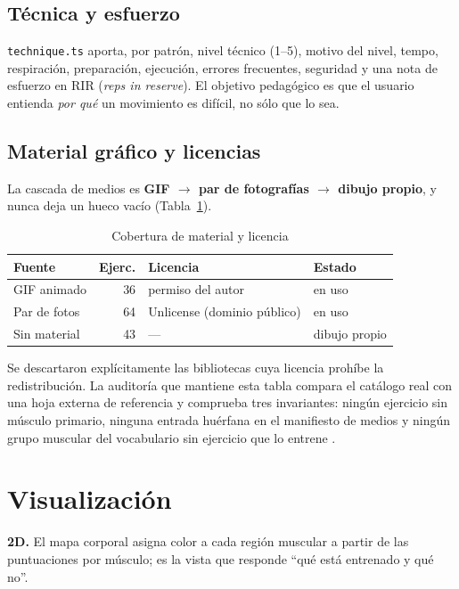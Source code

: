\documentclass[conference]{IEEEtran}
\newcommand{\code}[1]{\texttt{\small #1}}
\begin{document}
\subsection{T\'ecnica y esfuerzo}
\code{technique.ts} aporta, por patr\'on, nivel t\'ecnico (1--5), motivo del
nivel, tempo, respiraci\'on, preparaci\'on, ejecuci\'on, errores frecuentes,
seguridad y una nota de esfuerzo en RIR (\emph{reps in reserve}). El objetivo
pedag\'ogico es que el usuario entienda \emph{por qu\'e} un movimiento es
dif\'icil, no s\'olo que lo sea.

\subsection{Material gr\'afico y licencias}
La cascada de medios es \textbf{GIF $\rightarrow$ par de fotograf\'ias
$\rightarrow$ dibujo propio}, y nunca deja un hueco vac\'io
(Tabla~\ref{tab:media}).

\begin{table}[t]
\caption{Cobertura de material y licencia}
\label{tab:media}
\centering
\footnotesize
\begin{tabular}{@{}p{20mm}rp{28mm}p{13mm}@{}}
\toprule
Fuente & Ejerc. & Licencia & Estado \\
\midrule
GIF animado & 36 & permiso del autor & en uso \\
Par de fotos & 64 & Unlicense (dominio p\'ublico) & en uso \\
Sin material & 43 & --- & dibujo propio \\
\bottomrule
\end{tabular}
\end{table}

Se descartaron expl\'icitamente las bibliotecas cuya licencia proh\'ibe la
redistribuci\'on. La auditor\'ia que mantiene esta tabla compara el cat\'alogo
real con una hoja externa de referencia y comprueba tres invariantes: ning\'un
ejercicio sin m\'usculo primario, ninguna entrada hu\'erfana en el manifiesto de
medios y ning\'un grupo muscular del vocabulario sin ejercicio que lo
entrene \cite{audit}.

\section{Visualizaci\'on}

\textbf{2D.} El mapa corporal asigna color a cada regi\'on muscular a partir de
las puntuaciones por m\'usculo; es la vista que responde ``qu\'e est\'a
entrenado y qu\'e no''.
\end{document}
